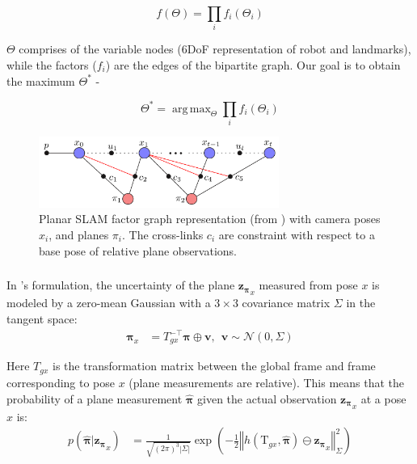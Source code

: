\documentclass[12pt]{article}
\DeclareMathOperator*{\argmax}{arg\,max}
\begin{document}
$$f(\Theta) = \prod_i f_i(\Theta_i)  $$ 

\noindent $\Theta$ comprises of the variable nodes (6DoF representation of robot and landmarks), while the factors ($f_i$) are the edges of the bipartite graph. Our goal is to obtain the maximum $\Theta^*$ - 

$$\Theta^* = \argmax_{\Theta} \prod_i f_i(\Theta_i)  $$ 


\begin{figure}[H]
\centering
        \includegraphics[width=0.7\textwidth]{relative_slam_planar}
    \caption{Planar SLAM factor graph representation (from \cite{kaess2015simultaneous})  with camera poses $x_i$, and planes $\pi_i$. The cross-links $c_i$ are constraint with respect to a base pose of relative plane observations.}
    \label{fig:slamplanar}
\end{figure}

\subsubsection*{\color{red}{Plane Measurement Model using quaternion Bingham Distribution}}
In \cite{kaess2015simultaneous}'s formulation, the uncertainty of the plane $\boldsymbol{z_\pi}_{x}$ measured from pose $x$ is modeled by a zero-mean Gaussian with a $3 \times 3$ covariance matrix $\Sigma$ in the tangent space:
\begin{align*}
	\boldsymbol{\pi}_x &= T_{gx}^{-\top} \boldsymbol{\pi} \oplus \boldsymbol{v}, \ \ \boldsymbol{v} \sim \mathcal{N} (0, \Sigma)
\end{align*}

Here $T_{gx}$ is the transformation matrix between the global frame and frame corresponding to pose $x$ (plane measurements are relative). 
This means that the probability of a plane measurement $\hat{\boldsymbol{\pi}}$ given the actual observation $\boldsymbol{z_\pi}_{x}$ at a pose $x$ is:
\begin{align*}
p(\hat{\boldsymbol{\pi}} | \boldsymbol{z_\pi}_{x}) &= \frac{1}{\sqrt{\left(2\pi\right)^{3}\left|\Sigma\right|}} \exp\left(-\frac{1}{2}\left\Vert h(\mathrm{T}_{g{x}},\hat{\boldsymbol{\pi}})\ominus\boldsymbol{z_\pi}_{x}\right\Vert _{\Sigma}^{2}\right)
\end{align*}
\end{document}
